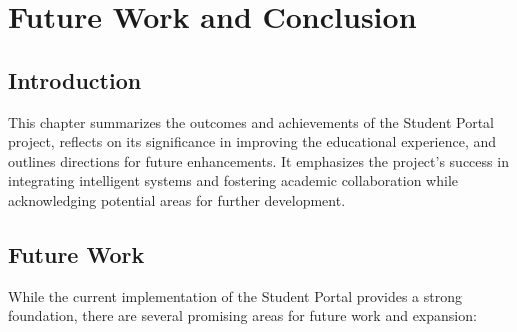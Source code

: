 \chapter{Future Work and Conclusion}

\section{Introduction}

This chapter summarizes the outcomes and achievements of the Student Portal project, reflects on its significance in improving the educational experience, and outlines directions for future enhancements. It emphasizes the project's success in integrating intelligent systems and fostering academic collaboration while acknowledging potential areas for further development.

\section{Future Work}

While the current implementation of the Student Portal provides a strong foundation, there are several promising areas for future work and expansion:

